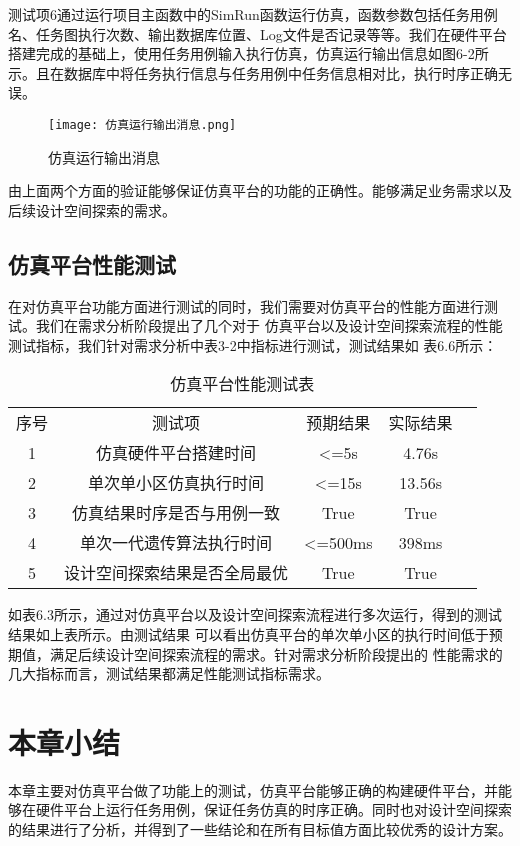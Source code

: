 测试项6通过运行项目主函数中的SimRun函数运行仿真，函数参数包括任务用例名、任务图执行次数、输出数据库位置、Log文件是否记录等等。我们在硬件平台搭建完成的基础上，使用任务用例输入执行仿真，仿真运行输出信息如图6-2所示。且在数据库中将任务执行信息与任务用例中任务信息相对比，执行时序正确无误。

\begin{figure}
    \centering
    \texttt{[image: 仿真运行输出消息.png]}
    \caption{仿真运行输出消息}
    \label{fig:badge}
\end{figure}

由上面两个方面的验证能够保证仿真平台的功能的正确性。能够满足业务需求以及后续设计空间探索的需求。

\subsection{仿真平台性能测试}
在对仿真平台功能方面进行测试的同时，我们需要对仿真平台的性能方面进行测试。我们在需求分析阶段提出了几个对于
仿真平台以及设计空间探索流程的性能测试指标，我们针对需求分析中表3-2中指标进行测试，测试结果如
表6.6所示：

\begin{table}[htb]
    \centering\normalsize
    \caption{仿真平台性能测试表}
    \begin{tabular}{|c|c|c|c|l}
    \cline{1-4}
    序号 & 测试项            & 预期结果              & 实际结果   &  \\ \cline{1-4}
    1  & 仿真硬件平台搭建时间     & \textless{}=5s    & 4.76s  &  \\ \cline{1-4}
    2  & 单次单小区仿真执行时间    & \textless{}=15s   & 13.56s &  \\ \cline{1-4}
    3  & 仿真结果时序是否与用例一致  & True              & True   &  \\ \cline{1-4}
    4  & 单次一代遗传算法执行时间   & \textless{}=500ms & 398ms  &  \\ \cline{1-4}
    5  & 设计空间探索结果是否全局最优 & True              & True   &  \\ \cline{1-4}
    \end{tabular}
    \end{table}

如表6.3所示，通过对仿真平台以及设计空间探索流程进行多次运行，得到的测试结果如上表所示。由测试结果
可以看出仿真平台的单次单小区的执行时间低于预期值，满足后续设计空间探索流程的需求。针对需求分析阶段提出的
性能需求的几大指标而言，测试结果都满足性能测试指标需求。

\section{本章小结}

本章主要对仿真平台做了功能上的测试，仿真平台能够正确的构建硬件平台，并能够在硬件平台上运行任务用例，保证任务仿真的时序正确。同时也对设计空间探索的结果进行了分析，并得到了一些结论和在所有目标值方面比较优秀的设计方案。